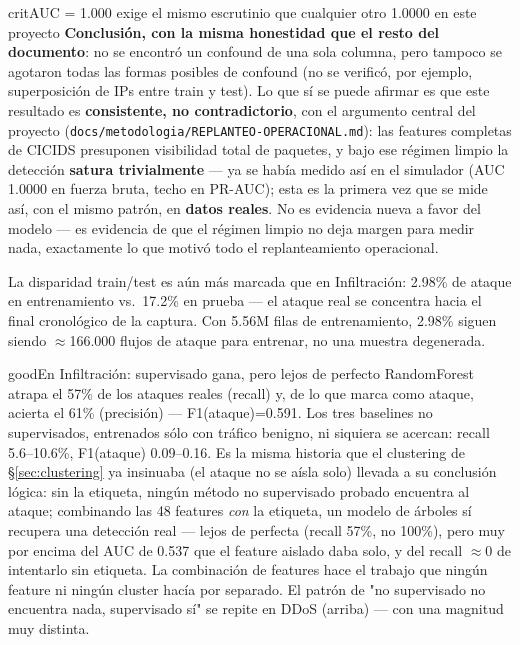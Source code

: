 \documentclass[11pt]{article}
\newcommand{\code}[1]{\texttt{\small #1}}
\begin{document}
\begin{cbox}{crit}{AUC = 1.000 exige el mismo escrutinio que cualquier otro 1.0000 en este proyecto}
\textbf{Conclusión, con la misma honestidad que el resto del documento}: no se encontró
un confound de una sola columna, pero tampoco se agotaron todas las formas posibles de
confound (no se verificó, por ejemplo, superposición de IPs entre train y test). Lo que
sí se puede afirmar es que este resultado es \textbf{consistente, no contradictorio}, con
el argumento central del proyecto (\code{docs/metodologia/REPLANTEO-OPERACIONAL.md}): las
features completas de CICIDS presuponen visibilidad total de paquetes, y bajo ese régimen
limpio la detección \textbf{satura trivialmente} --- ya se había medido así en el
simulador (AUC 1.0000 en fuerza bruta, techo en PR-AUC); esta es la primera vez que se
mide así, con el mismo patrón, en \textbf{datos reales}. No es evidencia nueva a favor del
modelo --- es evidencia de que el régimen limpio no deja margen para medir nada, exactamente
lo que motivó todo el replanteamiento operacional.
\end{cbox}

La disparidad train/test es aún más marcada que en Infiltración: 2.98\% de ataque en
entrenamiento vs.\ 17.2\% en prueba --- el ataque real se concentra hacia el final
cronológico de la captura. Con 5.56M filas de entrenamiento, 2.98\% siguen siendo
$\approx$166.000 flujos de ataque para entrenar, no una muestra degenerada.

\begin{cbox}{good}{En Infiltración: supervisado gana, pero lejos de perfecto}
RandomForest atrapa el 57\% de los ataques reales (recall) y, de lo que marca como
ataque, acierta el 61\% (precisión) --- F1(ataque)=0.591. Los tres baselines no
supervisados, entrenados sólo con tráfico benigno, ni siquiera se acercan: recall
5.6--10.6\%, F1(ataque) 0.09--0.16. Es la misma historia que el clustering de
\S\ref{sec:clustering} ya insinuaba (el ataque no se aísla solo) llevada a su conclusión
lógica: sin la etiqueta, ningún método no supervisado probado encuentra al ataque;
combinando las 48 features \emph{con} la etiqueta, un modelo de árboles sí recupera una
detección real --- lejos de perfecta (recall 57\%, no 100\%), pero muy por encima del AUC
de 0.537 que el feature aislado daba solo, y del recall $\approx$0 de intentarlo sin
etiqueta. La combinación de features hace el trabajo que ningún feature ni ningún cluster
hacía por separado. El patrón de "no supervisado no encuentra nada, supervisado sí" se
repite en DDoS (arriba) --- con una magnitud muy distinta.
\end{cbox}
\end{document}
